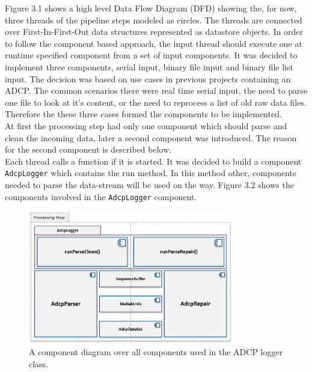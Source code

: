 Figure 3.1 shows a high level Data Flow Diagram (DFD) showing the, for now, three threads of the pipeline steps modeled as circles. The threads are connected over First-In-First-Out data structures represented as datastore objects. In order to follow the component based approach, the input thread should execute one at runtime specified component from a set of input components. It was decided to implement three components, serial input, binary file input and binary file list input. The decision was based on use cases in previous projects containing an ADCP. The common scenarios there were real time serial input, the need to parse one file to look at it's content, or the need to reprocess a list of old raw data files. Therefore the these three cases formed the components to be implemented.\\ 
At first the processing step had only one component which should parse and clean the incoming data, later a second component was introduced. The reason for the second component is described below.\\
Each thread calls a function if it is started. It was decided to build a component \texttt{AdcpLogger} which contains the run method. In this method other, components needed to parse the data-stream will be used on the way. Figure 3.2 shows the components involved in the \texttt{AdcpLogger} component. 
\begin{figure}[h]
\centering
      \includegraphics[width=0.8\textwidth]{components}
        \caption{A component diagram over all components used in the ADCP logger class.} 
\end{figure}
